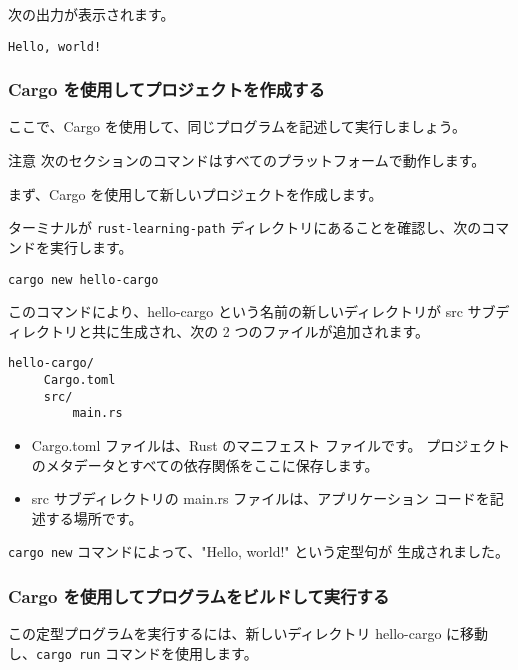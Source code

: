 次の出力が表示されます。

\begin{lstlisting}[numbers=none]
Hello, world!
\end{lstlisting}

\subsubsection{Cargo を使用してプロジェクトを作成する}

ここで、Cargo を使用して、同じプログラムを記述して実行しましょう。

\begin{itembox}[l]{注意}
次のセクションのコマンドはすべてのプラットフォームで動作します。
\end{itembox}

まず、Cargo を使用して新しいプロジェクトを作成します。

ターミナルが \texttt{rust-learning-path} ディレクトリにあることを確認し、次のコマンドを実行します。


\begin{lstlisting}[numbers=none]
cargo new hello-cargo
\end{lstlisting}

このコマンドにより、hello-cargo という名前の新しいディレクトリが src サブディレクトリと共に生成され、次の 2 つのファイルが追加されます。

\begin{lstlisting}[numbers=none]
hello-cargo/
     Cargo.toml
     src/
         main.rs
\end{lstlisting}

\begin{itemize}
\item Cargo.toml ファイルは、Rust のマニフェスト ファイルです。 プロジェクトのメタデータとすべての依存関係をここに保存します。
\item src サブディレクトリの main.rs ファイルは、アプリケーション コードを記述する場所です。
\end{itemize}

\texttt{cargo new} コマンドによって、"Hello, world!" という定型句が 生成されました。

\subsubsection{Cargo を使用してプログラムをビルドして実行する}

この定型プログラムを実行するには、新しいディレクトリ hello-cargo に移動し、\texttt{cargo run} コマンドを使用します。

